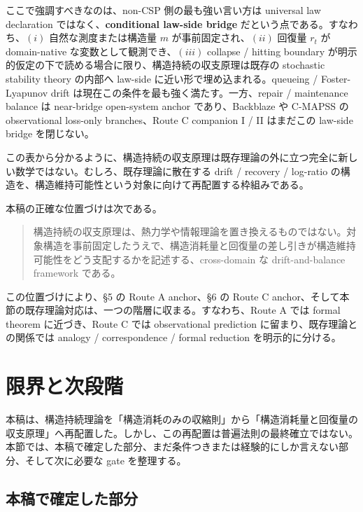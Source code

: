 \documentclass[12pt,a4paper]{article}
\begin{document}
ここで強調すべきなのは、non-CSP 側の最も強い言い方は universal law declaration ではなく、\textbf{conditional law-side bridge} だという点である。すなわち、\((i)\) 自然な測度または構造量 \(m\) が事前固定され、\((ii)\) 回復量 \(r_{t}\) が domain-native な変数として観測でき、\((iii)\) collapse / hitting boundary が明示的仮定の下で読める場合に限り、構造持続の収支原理は既存の stochastic stability theory の内部へ law-side に近い形で埋め込まれる。queueing / Foster-Lyapunov drift は現在この条件を最も強く満たす。一方、repair / maintenance balance は near-bridge open-system anchor であり、Backblaze や C-MAPSS の observational loss-only branches、Route C companion I / II はまだこの law-side bridge を閉じない。

この表から分かるように、構造持続の収支原理は既存理論の外に立つ完全に新しい数学ではない。むしろ、既存理論に散在する drift / recovery / log-ratio の構造を、構造維持可能性という対象に向けて再配置する枠組みである。

本稿の正確な位置づけは次である。

\begin{quote}
構造持続の収支原理は、熱力学や情報理論を置き換えるものではない。対象構造を事前固定したうえで、構造消耗量と回復量の差し引きが構造維持可能性をどう支配するかを記述する、cross-domain な drift-and-balance framework である。
\end{quote}

この位置づけにより、§5 の Route A anchor、§6 の Route C anchor、そして本節の既存理論対応は、一つの階層に収まる。すなわち、Route A では formal theorem に近づき、Route C では observational prediction に留まり、既存理論との関係では analogy / correspondence / formal reduction を明示的に分ける。

\section{限界と次段階}\label{ux9650ux754cux3068ux6b21ux6bb5ux968e}

本稿は、構造持続理論を「構造消耗のみの収縮則」から「構造消耗量と回復量の収支原理」へ再配置した。しかし、この再配置は普遍法則の最終確立ではない。本節では、本稿で確定した部分、まだ条件つきまたは経験的にしか言えない部分、そして次に必要な gate を整理する。

\subsection{本稿で確定した部分}\label{ux672cux7a3fux3067ux78baux5b9aux3057ux305fux90e8ux5206}
\end{document}
